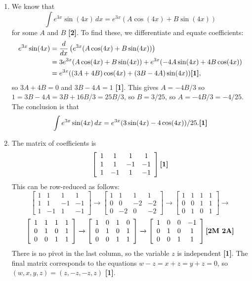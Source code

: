 \documentclass{amsart}
\newcommand{\xra}{\xrightarrow}
\renewcommand{\:}       {\colon}
\newcommand{\mks}[1]    {\mbox{\bf [#1]}}
\newcommand{\mk}        {\mbox{\bf [1]}}
\begin{document}
\begin{enumerate}
 \item %
  We know that 
  \[ \int e^{3x}\sin(4x)\,dx = e^{3x}(A\cos(4x) + B\sin(4x)) \]
  for some $A$ and $B$ \mks{2}.  To find these, we differentiate and
  equate coefficients: 
  \begin{align*}
   e^{3x}\sin(4x) &=
    \frac{d}{dx}\left(e^{3x}(A\cos(4x) + B\sin(4x))\right) \\
    &= 3e^{3x}(A\cos(4x) + B\sin(4x)) +
        e^{3x}(-4A\sin(4x) + 4B\cos(4x)) \\
    &= e^{3x}((3A+4B)\cos(4x) + (3B-4A)\sin(4x)) \mk,
  \end{align*}
  so $3A+4B=0$ and $3B-4A=1$ \mk.  This gives $A=-4B/3$ so
  $1=3B-4A=3B+16B/3=25B/3$, so $B=3/25$, so $A=-4B/3=-4/25$.  The
  conclusion is that
  \[ \int e^{3x}\sin(4x)\,dx = e^{3x}(3\sin(4x) - 4\cos(4x))/25. \mk \]

 \item %
  The matrix of coefficients is
  \[ \left[\begin{array}{cccc}
      1 & 1 & 1 & 1 \\ 1 & 1 & -1 & -1 \\ 1 & -1 & 1 & -1
     \end{array}\right] \mk
  \]
  This can be row-reduced as follows:
  \[ \left[\begin{array}{cccc}
      1 & 1 & 1 & 1 \\ 1 & 1 & -1 & -1 \\ 1 & -1 & 1 & -1
     \end{array}\right] \xra{}
     \left[\begin{array}{cccc}
      1 & 1 & 1 & 1 \\ 0 & 0 & -2 & -2 \\ 0 & -2 & 0 & -2
     \end{array}\right] \xra{}
     \left[\begin{array}{cccc}
      1 & 1 & 1 & 1 \\ 0 & 0 & 1 & 1 \\ 0 & 1 & 0 & 1
     \end{array}\right] \xra{}
  \]
  \[ \left[\begin{array}{cccc}
      1 & 1 & 1 & 1 \\ 0 & 1 & 0 & 1 \\ 0 & 0 & 1 & 1
     \end{array}\right] \xra{}
     \left[\begin{array}{cccc}
      1 & 0 & 1 & 0 \\ 0 & 1 & 0 & 1 \\ 0 & 0 & 1 & 1
     \end{array}\right] \xra{}
     \left[\begin{array}{cccc}
      1 & 0 & 0 & -1 \\ 0 & 1 & 0 & 1 \\ 0 & 0 & 1 & 1
     \end{array}\right] \mks{2M 2A}
  \]
  There is no pivot in the last column, so the variable $z$ is
  independent \mk.  The final matrix corresponds to the equations
  $w-z=x+z=y+z=0$, so $(w,x,y,z)=(z,-z,-z,z)$ \mk.


\end{enumerate}
\end{document}
